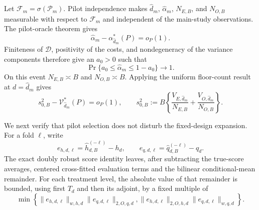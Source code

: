 Let \(\mathscr F_m=\sigma(\mathcal P_m)\).  Pilot independence makes \(\hat d_m\), \(\hat\alpha_m\), \(N_{E,B}\), and \(N_{O,B}\) measurable with respect to \(\mathscr F_m\) and independent of the main-study observations.  The pilot-oracle theorem gives
\[
 \hat\alpha_m-\alpha_{\hat d_m}^*(P)=o_P(1).
\]
Finiteness of \(\mathcal D\), positivity of the costs, and nondegeneracy of the variance components therefore give an \(a_0>0\) such that
\[
 \Pr\{a_0\le\hat\alpha_m\le1-a_0\}\longrightarrow1. \tag{1}
\]
On this event \(N_{E,B}\asymp B\) and \(N_{O,B}\asymp B\).  Applying the uniform floor-count result at \(d=\hat d_m\) gives
\[
 s_{0,B}^2-\mathcal V_{\hat d_m}^*(P)=o_P(1),\qquad
 s_{0,B}^2:=B\left\{\frac{V_{E,\hat d_m}}{N_{E,B}}
 +\frac{V_{O,\hat d_m}}{N_{O,B}}\right\}. \tag{2}
\]

We next verify that pilot selection does not disturb the fixed-design expansion.  For a fold \(\ell\), write
\[
 e_{h,d,\ell}=\hat h_{d,B}^{(-\ell)}-h_d,
 \qquad e_{q,d,\ell}=\hat q_{d,B}^{(-\ell)}-q_d.
\]
The exact doubly robust score identity leaves, after subtracting the true-score averages, centered cross-fitted evaluation terms and the bilinear conditional-mean remainder.  For each treatment level, the absolute value of that remainder is bounded, using first \(T_d\) and then its adjoint, by a fixed multiple of
\[
 \min\left\{
 \|e_{h,d,\ell}\|_{w,h,d}\|e_{q,d,\ell}\|_{2,O,q,d},
 \|e_{h,d,\ell}\|_{2,O,h,d}\|e_{q,d,\ell}\|_{w,q,d}
 \right\}. \tag{3}
\]
